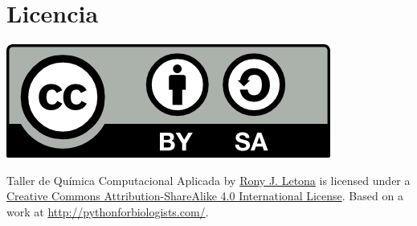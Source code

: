 \documentclass[10pt,letterpaper]{article}
\begin{document}
\section*{Licencia}

\noindent \includegraphics{img/cc_big.png}

\noindent Taller de Qu\'imica Computacional Aplicada by \href{http://github.com/zronyj/TC3Q}{Rony J. Letona} is licensed under a \href{http://creativecommons.org/licenses/by-sa/4.0/}{Creative Commons Attribution-ShareAlike 4.0 International License}.
Based on a work at \url{http://pythonforbiologists.com/}.
\end{document}
